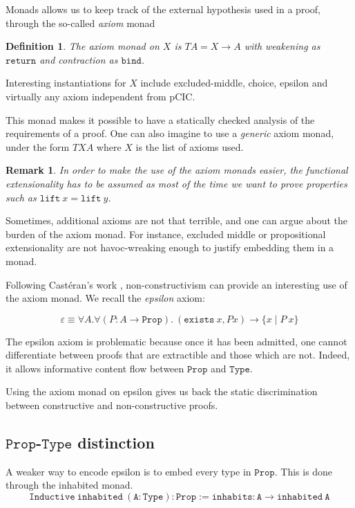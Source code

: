 \documentclass[a4paper,11pt]{article}
\newtheorem{definition}{Definition}
\newtheorem{remark}{Remark}
\theoremstyle{definition}
\theoremstyle{remark}
\begin{document}
  Monads allows us to keep track of the external hypothesis used in a proof, through the so-called \emph{axiom} monad

  \begin{definition}
    The axiom monad on $X$ is $T A = X \rightarrow A$ with weakening as $\mathtt{return}$ and contraction as $\mathtt{bind}$.
  \end{definition}

  Interesting instantiations for $X$ include excluded-middle, choice, epsilon and virtually any axiom independent from pCIC.

  This monad makes it possible to have a statically checked analysis of the requirements of a proof. One can also imagine to use a \emph{generic} axiom monad, under the form $T X A$ where $X$ is the list of axioms used.

  \begin{remark}
    In order to make the use of the axiom monads easier, the functional extensionality has to be assumed as most of the time we want to prove properties such as $\mathtt{lift}\ x = \mathtt{lift}\ y$.
  \end{remark} %

  Sometimes, additional axioms are not that terrible, and one can argue about the burden of the axiom monad. For instance, excluded middle or propositional extensionality are not havoc-wreaking enough to justify embedding them in a monad.

  Following Castéran's work \cite{casteranepsilon}, non-constructivism can provide an interesting use of the axiom monad. We recall the \emph{epsilon} axiom:

$$\varepsilon ≡ \forall A.\forall (P : A\rightarrow  \mathtt{Prop}).\ (\mathtt{exists}\ x, P x) \rightarrow \{x\mid P\  x\}$$

  The epsilon axiom is problematic because once it has been admitted, one cannot differentiate between proofs that are extractible and those which are not. Indeed, it allows informative content flow between $\mathtt{Prop}$ and $\mathtt{Type}$.

  Using the axiom monad on epsilon gives us back the static discrimination between constructive and non-constructive proofs.

\subsection{$\mathtt{Prop}$-$\mathtt{Type}$ distinction}

  A weaker way to encode epsilon is to embed every type in $\mathtt{Prop}$. This is done through the inhabited monad.
  $$\mathtt{Inductive\ inhabited\ (A : Type) : Prop :=  inhabits : A \rightarrow inhabited\ A}$$
\end{document}
